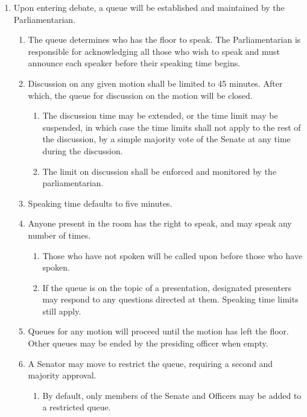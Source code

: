 \documentclass{uniondoc}
\begin{document}
\begin{enumerate}
	\item Upon entering debate, a queue will be established and maintained by the Parliamentarian.
	      \begin{enumerate}
		      \item The queue determines who has the floor to speak.
		            The Parliamentarian is responsible for acknowledging all those who wish to speak and must announce each speaker before their speaking time begins.
		      \item Discussion on any given motion shall be limited to 45 minutes.
		            After which, the queue for discussion on the motion will be closed.
		            \begin{enumerate}
			            \item The discussion time may be extended,
			                  or the time limit may be suspended,
			                  in which case the time limits shall not apply to the rest of the discussion, by a simple majority vote of the Senate at any time during the discussion.
			            \item The limit on discussion shall be enforced and monitored by the parliamentarian.
		            \end{enumerate}
		      \item Speaking time defaults to five minutes.
		      \item Anyone present in the room has the right to speak,
		            and may speak any number of times.
		            \begin{enumerate}
			            \item Those who have not spoken will be called upon before those who have spoken.
			            \item If the queue is on the topic of a presentation, designated presenters may respond to any questions directed at them.
			                  Speaking time limits still apply.
		            \end{enumerate}
		      \item Queues for any motion will proceed until the motion has left the floor.
		            Other queues may be ended by the presiding officer when empty.
		      \item A Senator may move to restrict the queue, requiring a second and majority approval.
		            \begin{enumerate}
			            \item By default, only members of the Senate and Officers may be added to a restricted queue.

\end{enumerate}
\end{enumerate}
\end{enumerate}
\end{document}
